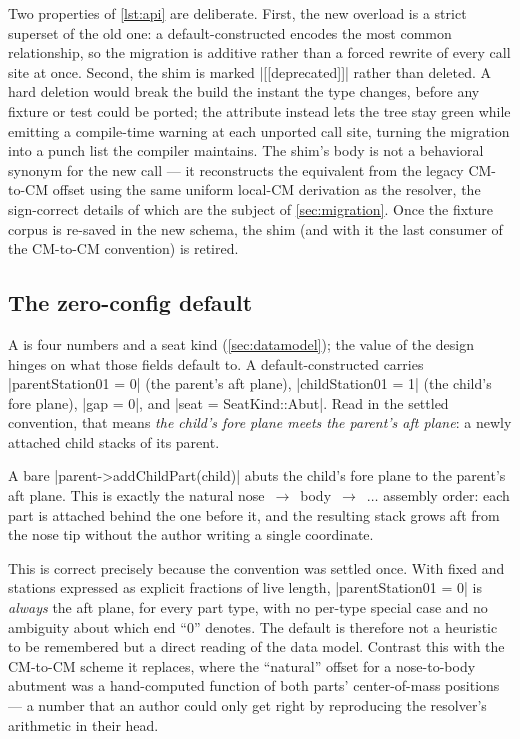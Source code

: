 Two properties of \cref{lst:api} are deliberate. First, the new overload is a strict
superset of the old one: a default-constructed  encodes the most common
relationship, so the migration is additive rather than a forced rewrite of every call
site at once. Second, the shim is marked \cppinline|[[deprecated]]| rather than deleted.
A hard deletion would break the build the instant the type changes, before any fixture or
test could be ported; the attribute instead lets the tree stay green while emitting a
compile-time warning at each unported call site, turning the migration into a punch list
the compiler maintains. The shim's body is not a behavioral synonym for the new call --- it
reconstructs the equivalent  from the legacy CM-to-CM offset using the same
uniform local-CM derivation as the resolver, the sign-correct details of which are the subject of
\cref{sec:migration}. Once the fixture corpus is re-saved in the new schema, the shim
(and with it the last consumer of the CM-to-CM convention) is retired.

\subsection{The zero-config default}

A  is four numbers and a seat kind (\cref{sec:datamodel}); the value of
the design hinges on what those fields default to. A default-constructed
 carries \cppinline|parentStation01 = 0| (the parent's aft plane),
\cppinline|childStation01 = 1| (the child's fore plane), \cppinline|gap = 0|, and
\cppinline|seat = SeatKind::Abut|. Read in the settled \zfwd{} convention, that means
\emph{the child's fore plane meets the parent's aft plane}: a newly attached child stacks
\zaft{} of its parent.

\begin{designrule}
A bare \cppinline|parent->addChildPart(child)| abuts the child's fore plane to the
parent's aft plane. This is exactly the natural nose~$\rightarrow$~body~$\rightarrow$~$\dots$
assembly order: each part is attached behind the one before it, and the resulting stack
grows aft from the nose tip without the author writing a single coordinate.
\end{designrule}

This is correct precisely because the convention was settled once. With \zfwd{} fixed and
stations expressed as explicit fractions of live length, \cppinline|parentStation01 = 0|
is \emph{always} the aft plane, for every part type, with no per-type special case and no
ambiguity about which end ``0'' denotes. The default is therefore not a heuristic to be
remembered but a direct reading of the data model. Contrast this with the CM-to-CM scheme
it replaces, where the ``natural'' offset for a nose-to-body abutment was a hand-computed
function of both parts' center-of-mass positions --- a number that an author could only get
right by reproducing the resolver's arithmetic in their head.

